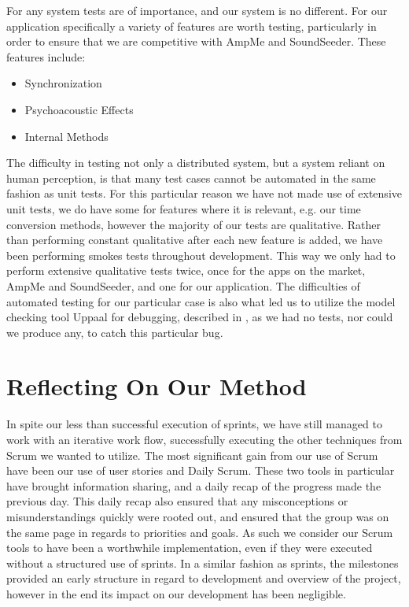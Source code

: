 \bigskip
For any system tests are of importance, and our system is no different.
For our application specifically a variety of features are worth testing, particularly in order to ensure that we are competitive with AmpMe and SoundSeeder.
These features include:
\begin{itemize}
    \item Synchronization
    \item Psychoacoustic Effects
    \item Internal Methods
\end{itemize}
The difficulty in testing not only a distributed system, but a system reliant on human perception, is that many test cases cannot be automated in the same fashion as unit tests.
For this particular reason we have not made use of extensive unit tests, we do have some for features where it is relevant, e.g. our time conversion methods, however the majority of our tests are qualitative.
Rather than performing constant qualitative after each new feature is added, we have been performing smokes tests throughout development.
This way we only had to perform extensive qualitative tests twice, once for the apps on the market, AmpMe and SoundSeeder, and one for our application.
The difficulties of automated testing for our particular case is also what led us to utilize the model checking tool Uppaal for debugging, described in , as we had no tests, nor could we produce any, to catch this particular bug.

\section{Reflecting On Our Method}
In spite our less than successful execution of sprints, we have still managed to work with an iterative work flow, successfully executing the other techniques from Scrum we wanted to utilize.
The most significant gain from our use of Scrum have been our use of user stories and Daily Scrum.
These two tools in particular have brought information sharing, and a daily recap of the progress made the previous day.
This daily recap also ensured that any misconceptions or misunderstandings quickly were rooted out, and ensured that the group was on the same page in regards to priorities and goals.
As such we consider our Scrum tools to have been a worthwhile implementation, even if they were executed without a structured use of sprints.
In a similar fashion as sprints, the milestones provided an early structure in regard to development and overview of the project, however in the end its impact on our development has been negligible.

